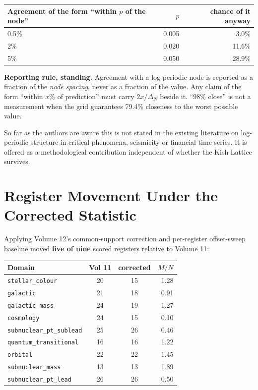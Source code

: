 \documentclass[11pt, letterpaper, openany]{book}
\newcommand{\MN}{M/N}
\begin{document}
\begin{table}[H]
\centering
\small
\renewcommand{\arraystretch}{1.25}
\begin{tabular}{@{}lrr@{}}
\toprule
\textbf{Agreement of the form ``within $p$ of the node''} & \textbf{$p$} & \textbf{chance of it anyway} \\
\midrule
0.5\% & 0.005 & 3.0\% \\
2\% & 0.020 & 11.6\% \\
5\% & 0.050 & 28.9\% \\
\bottomrule
\end{tabular}
\end{table}

\begin{formbox}
\textbf{Reporting rule, standing.} Agreement with a log-periodic node is reported as a fraction of
the \emph{node spacing}, never as a fraction of the value. Any claim of the form ``within $x\%$ of
prediction'' must carry $2x/\Delta_N$ beside it. ``98\% close'' is not a measurement when the grid
guarantees 79.4\% closeness to the worst possible value.
\end{formbox}

\noindent
So far as the authors are aware this is not stated in the existing literature on log-periodic
structure in critical phenomena, seismicity or financial time series. It is offered as a
methodological contribution independent of whether the Kish Lattice survives.

\section{Register Movement Under the Corrected Statistic}
\label{sec:movement}

Applying Volume 12's common-support correction and per-register offset-sweep baseline moved
\textbf{five of nine} scored registers relative to Volume 11:

\begin{table}[H]
\centering\small
\begin{tabular}{@{}lccr@{}}
\toprule
\textbf{Domain} & \textbf{Vol 11} & \textbf{corrected} & \textbf{$\MN$} \\
\midrule
\texttt{stellar\_colour} & 20 & 15 & 1.28 \\
\texttt{galactic} & 21 & 18 & 0.91 \\
\texttt{galactic\_mass} & 24 & 19 & 1.27 \\
\texttt{cosmology} & 24 & 15 & 0.10 \\
\texttt{subnuclear\_pt\_sublead} & 25 & 26 & 0.46 \\
\midrule
\texttt{quantum\_transitional} & 16 & 16 & 1.22 \\
\texttt{orbital} & 22 & 22 & 1.45 \\
\texttt{subnuclear\_mass} & 13 & 13 & 1.89 \\
\texttt{subnuclear\_pt\_lead} & 26 & 26 & 0.50 \\
\bottomrule
\end{tabular}
\end{table}
\end{document}
